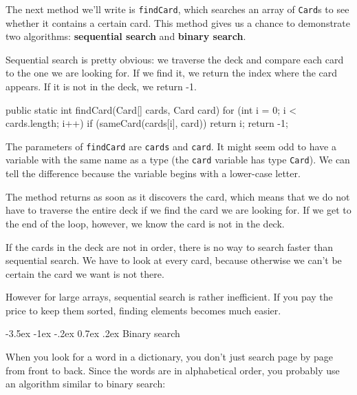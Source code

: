 \documentclass[12pt]{book}
\makeatletter
\theoremstyle{exercise}
\newcommand{\java}[1]{\verb"#1"}
\renewcommand{\section}{\@startsection{section}{1}{\z@}%
    {-3.5ex \@plus -1ex \@minus -.2ex}%
    {0.7ex \@plus.2ex}%
    {\normalfont\Large\bfseries}}
\newcommand{\java}[1]{\lstinline{#1}} %
\makeatother
\begin{document}

The next method we'll write is \java{findCard}, which searches an array of \java{Card}s to see whether it contains a certain card.
This method gives us a chance to demonstrate two algorithms: {\bf sequential search} and {\bf binary search}.


Sequential search is pretty obvious: we traverse the deck and compare each card to the one we are looking for.
If we find it, we return the index where the card appears.
If it is not in the deck, we return -1.

\begin{code}
public static int findCard(Card[] cards, Card card) {
    for (int i = 0; i < cards.length; i++) {
        if (sameCard(cards[i], card)) {
            return i;
        }
    }
    return -1;
}
\end{code}

The parameters of \java{findCard} are \java{cards} and \java{card}.
It might seem odd to have a variable with the same name as a type (the \java{card} variable has type \java{Card}).
We can tell the difference because the variable begins with a lower-case letter.


The method returns as soon as it discovers the card, which means that we do not have to traverse the entire deck if we find the card we are looking for.
If we get to the end of the loop, however, we know the card is not in the deck.

If the cards in the deck are not in order, there is no way to search faster than sequential search.
We have to look at every card, because otherwise we can't be certain the card we want is not there.

However for large arrays, sequential search is rather inefficient.
If you pay the price to keep them sorted, finding elements becomes much easier.


\section{Binary search}

When you look for a word in a dictionary, you don't just search page by page from front to back.
Since the words are in alphabetical order, you probably use an algorithm similar to binary search:
\end{document}
